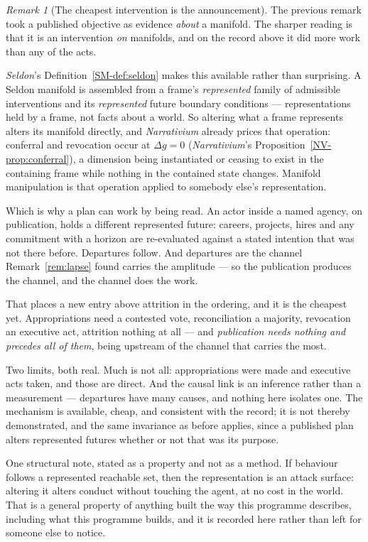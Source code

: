 \documentclass[11pt,a4paper]{article}
\theoremstyle{remark}
\newtheorem{remark}[definition]{Remark}
\begin{document}
\begin{remark}[The cheapest intervention is the announcement]\label{rem:announce}
The previous remark took a published objective as evidence \emph{about} a manifold. The sharper
reading is that it is an intervention \emph{on} manifolds, and on the record above it did more work than
any of the acts.

\emph{Seldon}'s Definition~\ref{SM-def:seldon} makes this available rather than surprising. A Seldon
manifold is assembled from a frame's \emph{represented} family of admissible interventions and its \emph{represented}
future boundary conditions --- representations held by a frame, not facts about a world. So
altering what a frame represents alters its manifold directly, and \emph{Narrativium} already prices that
operation: conferral and revocation occur at $\Delta g = 0$ (\emph{Narrativium}'s
Proposition~\ref{NV-prop:conferral}), a dimension being instantiated or ceasing to exist in the
containing frame while nothing in the contained state changes. Manifold manipulation is that operation
applied to somebody else's representation.

Which is why a plan can work by being read. An actor inside a named agency, on publication, holds
a different represented future: careers, projects, hires and any commitment with a horizon are
re-evaluated against a stated intention that was not there before. Departures follow. And
departures are the channel Remark~\ref{rem:lapse} found carries the amplitude --- so the publication
produces the channel, and the channel does the work.

That places a new entry above attrition in the ordering, and it is the cheapest yet. Appropriations
need a contested vote, reconciliation a majority, revocation an executive act, attrition nothing at all
--- and \emph{publication needs nothing and precedes all of them}, being upstream of the channel that
carries the most.

Two limits, both real. Much is not all: appropriations were made and executive acts taken, and
those are direct. And the causal link is an inference rather than a measurement --- departures
have many causes, and nothing here isolates one. The mechanism is available, cheap, and consistent with
the record; it is not thereby demonstrated, and the same invariance as before applies, since a published
plan alters represented futures whether or not that was its purpose.

One structural note, stated as a property and not as a method. If behaviour follows a represented
reachable set, then the representation is an attack surface: altering it alters conduct without
touching the agent, at no cost in the world. That is a general property of anything built the way this
programme describes, including what this programme builds, and it is recorded here rather than
left for someone else to notice.
\end{remark}
\end{document}
